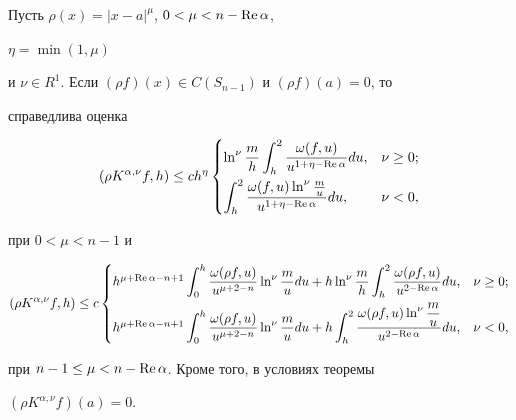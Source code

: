 \begin{thms}


Пусть $\rho(x) = |x-a|^\mu$, $0 < \mu < n-\operatorname{Re} \alpha$,


$\eta = \min(1,\mu)$


и $\nu\in R^1$. Если $(\rho f)(x) \in C(S_{n-1})$ и $(\rho f)(a) = 0$, то


справедлива оценка


$$


(\rho K^{\alpha,\nu}f,h) \le c h^{\eta}


\begin{cases}


\ln^\nu \dfrac{m}{h} \displaystyle\int_h^2


\frac{\omega (f,u)}{u^{1+\eta-\re \alpha}} du, & \nu \ge 0;\\[3mm]


\displaystyle\int _h^2


\dfrac{\omega (f,u)\ln^\nu \frac{m}{u}}{u^{1+\eta-\re \alpha}} du, & \nu


<0, 


\end{cases}


$$


при $0 < \mu < n-1$ и


$$


(\rho K^{\alpha,\nu}f,h) \le c


\begin{cases}


h^{\mu+\re\alpha-n+1}


\displaystyle\int _0^h \dfrac{\omega(\rho f,u)}{u^{\mu+2-


n}} \ln^\nu \dfrac{m}{u} du + h\ln^\nu \dfrac{m}{h} \displaystyle\int_h^2


\dfrac{\omega(\rho f,u)}{u^{2-\re \alpha}} du, & \nu \ge 0;\\[3mm]


h^{\mu+\re\alpha-n+1}


\displaystyle\int _0^h \dfrac{\omega(\rho f,u)}{u^{\mu+2-


n}} \ln^\nu \dfrac{m}{u} du + h \displaystyle\int_h^2 \dfrac{\omega(\rho


f,u)\ln^\nu \dfrac{m}{u}}{u^{2-\re \alpha}} du , & \nu <0, 


\end{cases}


$$


при $n-1 \le \mu < n-\operatorname{Re} \alpha$. Кроме того, в условиях теоремы


$(\rho K^{\alpha,\nu}f)(a) = 0$.


\end{thms}





